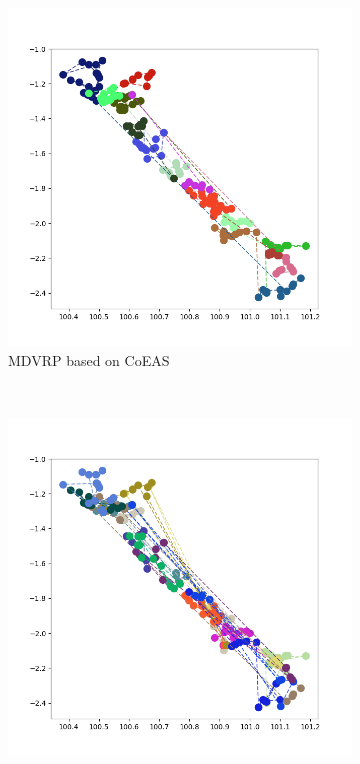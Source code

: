 \documentclass[conference]{IEEEtran}
\begin{document}
\begin{figure}[h!]
	\centering
	\begin{subfigure}[t]{0.5\textwidth}
		\centering
		\includegraphics[width=\textwidth]{Resources/Images/test_result_normal_field_coes_paper}
		\caption{MDVRP based on CoEAS}
		\label{fig:test_result_normal_field_coes_paper}
	\end{subfigure}%
	~ 
	\begin{subfigure}[t]{0.5\textwidth}
		\centering
		\includegraphics[width=\textwidth]{Resources/Images/test_result_normal_field_pubsub_coes_paper}

\end{subfigure}
\end{figure}
\end{document}
